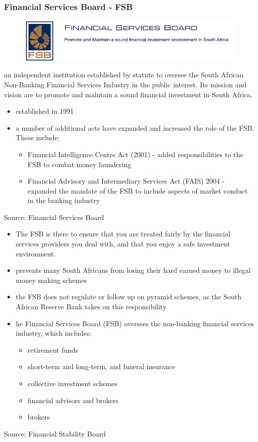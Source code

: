 \documentclass[11pt]{beamer}
\begin{document}
\begin{frame}
\frametitle{Financial Services Board - FSB}
\begin{figure}
\includegraphics[width=0.6 \textwidth]{FSB.png}
\end{figure}
an independent institution established by statute to oversee the South African Non-Banking Financial Services Industry in the public interest. Its mission and vision are to promote and maintain a sound financial investment in South Africa.
\begin{itemize}
\item established in 1991
\item a number of additional acts have expanded and increased the role of the FSB. These include:
\begin{itemize}
\item Financial Intelligence Centre Act (2001) - added responsibilities to the FSB to combat money laundering
\item Financial Advisory and Intermediary Services Act (FAIS) 2004 - expanded the mandate of the FSB to include aspects of market conduct in the banking industry
\end{itemize}
\end{itemize}
\tiny{Source: Financial Services Board}
\end{frame}

\begin{frame}
\begin{itemize}
\item The FSB is there to ensure that you are treated fairly by the financial services providers you deal with, and that you enjoy a safe investment environment.
\item prevents many South Africans from losing their hard earned money to illegal money making schemes
\item the FSB does not regulate or follow up on pyramid schemes, as the South African Reserve Bank takes on this responsibility
\item he Financial Services Board (FSB) oversees the non-banking financial services industry, which includes:
\begin{itemize}
\item retirement funds
\item short-term and long-term, and funeral insurance
\item collective investment schemes
\item financial advisors and brokers
\item brokers
\end{itemize}
\end{itemize}
\tiny{Source: Financial Stability Board}
\end{frame}
\end{document}
